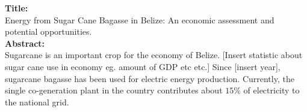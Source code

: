 \documentclass[12pt]{article}
\begin{document}
\noindent
\textbf{Title:} \\
Energy from Sugar Cane Bagasse in Belize: An economic assessment and potential opportunities. \\

\noindent\textbf{Abstract:}\\
Sugarcane is an important crop for the economy of Belize. [Insert statistic about sugar cane use in economy eg. amount of GDP etc etc.] Since [insert year], sugarcane bagasse has been used for electric energy production. Currently, the single co-generation plant in the country contributes about $15\%$ of electricity to the national grid. 
\end{document}
